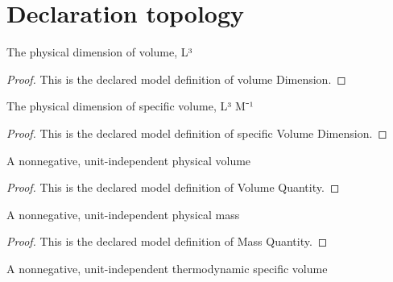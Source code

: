 \section{Declaration topology}
\begin{definition}
  \label{def:physics:phyx-mini-0439:phyxminiproblems-problemphyxmini0439-volumedimension}
  The physical dimension of volume, L³
\end{definition}
\begin{proof}
  This is the declared model definition of volume Dimension.
\end{proof}
\begin{definition}
  \label{def:physics:phyx-mini-0439:phyxminiproblems-problemphyxmini0439-specificvolumedimension}
  The physical dimension of specific volume, L³ M⁻¹
\end{definition}
\begin{proof}
  This is the declared model definition of specific Volume Dimension.
\end{proof}
\begin{definition}
  \label{def:physics:phyx-mini-0439:phyxminiproblems-problemphyxmini0439-volumequantity}
  A nonnegative, unit-independent physical volume
\end{definition}
\begin{proof}
  This is the declared model definition of Volume Quantity.
\end{proof}
\begin{definition}
  \label{def:physics:phyx-mini-0439:phyxminiproblems-problemphyxmini0439-massquantity}
  A nonnegative, unit-independent physical mass
\end{definition}
\begin{proof}
  This is the declared model definition of Mass Quantity.
\end{proof}
\begin{definition}
  \label{def:physics:phyx-mini-0439:phyxminiproblems-problemphyxmini0439-specificvolumequantity}
  A nonnegative, unit-independent thermodynamic specific volume
\end{definition}

